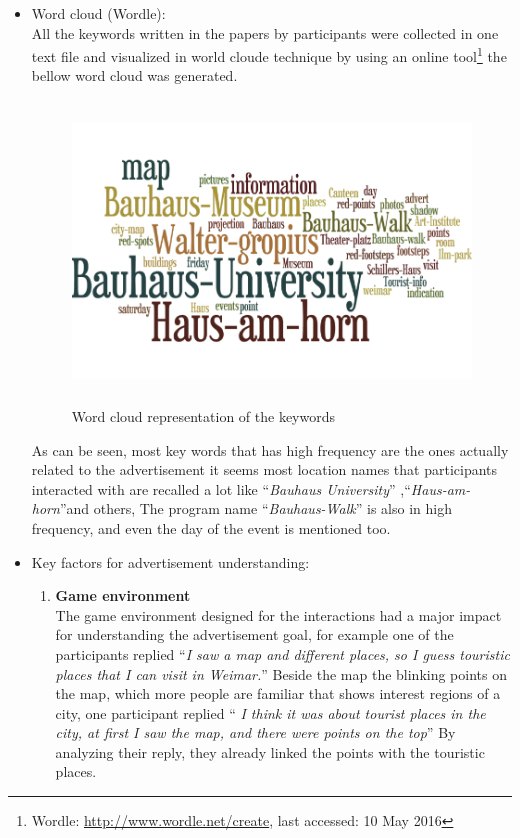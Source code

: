 \begin{itemize}
\begin{enumerate}
\end{enumerate}

\item Word cloud (Wordle): \\
All the keywords written in the papers by participants were collected in one text file and visualized in world cloude technique by using an online tool\footnote{Wordle: \url{http://www.wordle.net/create}, last accessed: 10 May 2016} the bellow word cloud was generated.

\begin{figure}[H]
\centering
\includegraphics[width=12cm,height=8cm]{Figures/6/wordle}%
 \caption{Word cloud representation of the keywords}%
 \label{fig:wordle}%
\end{figure}

As can be seen, most key words that has high frequency are the ones actually related to the advertisement it seems most location names that participants interacted with are recalled a lot like ``\emph{Bauhaus University}'' ,``\emph{Haus-am-horn}''and others, The program name ``\emph{Bauhaus-Walk}'' is also in high frequency, and even the day of the event is mentioned too.


\item Key factors for advertisement understanding: \\
\begin{enumerate}
\item	\textbf{Game environment} \\
The game environment designed for the interactions had a major impact for understanding the advertisement goal, for example one of the participants replied ``\emph{I saw a map and different places, so I guess touristic places that I can visit in Weimar.}'' Beside the map the blinking points on the map, which more people are familiar that shows interest regions of a city, one participant replied ``\emph{ I think it was about tourist places in the city, at first I saw the map, and there were points on the top}'' By analyzing their reply, they already linked the points with the touristic places.


\end{enumerate}
\end{itemize}
